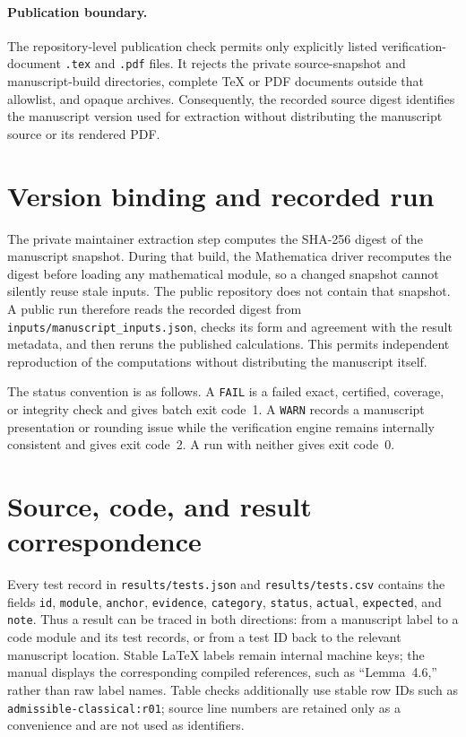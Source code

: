 \documentclass[12pt,a4paper]{amsart}
\theoremstyle{remark}
\theoremstyle{definition}
\begin{document}
\paragraph{Publication boundary.}
The repository-level publication check permits only explicitly listed
verification-document \texttt{.tex} and \texttt{.pdf} files.  It rejects
the private source-snapshot and manuscript-build directories, complete TeX or
PDF documents outside that allowlist, and opaque archives.  Consequently, the
recorded source digest identifies the manuscript version used for extraction
without distributing the manuscript source or its rendered PDF.

\section{Version binding and recorded run}

The private maintainer extraction step computes the SHA-256 digest of the
manuscript snapshot.  During that build, the Mathematica driver recomputes the
digest before loading any mathematical module, so a changed snapshot cannot
silently reuse stale inputs.  The public repository does not contain that
snapshot.  A public run therefore reads the recorded digest from
\nolinkurl{inputs/manuscript_inputs.json}, checks its form and agreement with
the result metadata, and then reruns the published calculations.  This permits
independent reproduction of the computations without distributing the
manuscript itself.



The status convention is as follows.  A \texttt{FAIL} is a failed exact,
certified, coverage, or integrity check and gives batch exit code~1.  A
\texttt{WARN} records a manuscript presentation or rounding issue while the
verification engine remains internally consistent and gives exit code~2.  A
run with neither gives exit code~0.

\section{Source, code, and result correspondence}

Every test record in \nolinkurl{results/tests.json} and
\nolinkurl{results/tests.csv} contains the fields
\texttt{id}, \texttt{module}, \texttt{anchor}, \texttt{evidence},
\texttt{category}, \texttt{status}, \texttt{actual}, \texttt{expected}, and
\texttt{note}.  Thus a result can be traced in both directions: from a
manuscript label to a code module and its test records, or from a test ID back
to the relevant manuscript location.  Stable LaTeX labels remain internal
machine keys; the manual displays the corresponding compiled references, such
as ``Lemma~4.6,'' rather than raw label names.  Table checks additionally use stable row
IDs such as \texttt{admissible-classical:r01}; source line numbers are retained
only as a convenience and are not used as identifiers.
\end{document}
